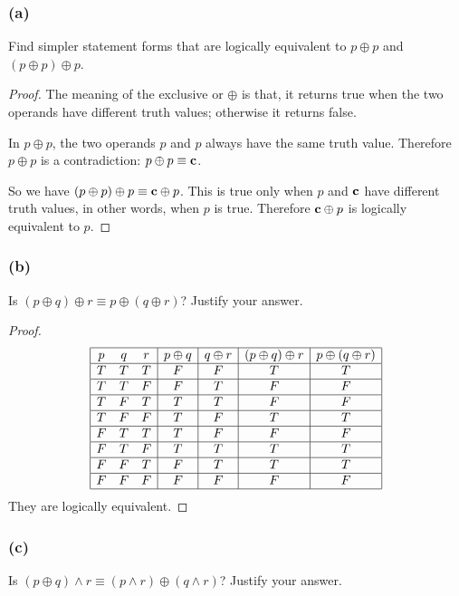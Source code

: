 \documentclass[14pt]{extarticle}
\newcommand{\false}{{\bf c}} \newcommand{\bic}{\leftrightarrow}
\begin{document}
\subsubsection{(a)} Find simpler statement forms that are logically equivalent
to $p \oplus p$ and $(p \oplus p) \oplus p$.

\begin{proof} The meaning of the exclusive or $\oplus$ is that, it returns true
when the two operands have different truth values; otherwise it returns false.

In $p \oplus p$, the two operands $p$ and $p$ always have the same truth value.
Therefore $p \oplus p$ is a contradiction: $p \oplus p \equiv \false$.

So we have $(p \oplus p) \oplus p \equiv \false \oplus p$. This is true only
when $p$ and $\false$ have different truth values, in other words, when $p$ is
true. Therefore $\false \oplus p$ is logically equivalent to $p$. \end{proof}

\subsubsection{(b)} Is $(p \oplus q) \oplus r \equiv p \oplus (q \oplus r)$?
Justify your answer.

\begin{proof} $$ \begin{array}{|ccc|c|c|c|c|} \hline p & q & r & p \oplus q & q
\oplus r & (p \oplus q) \oplus r & p \oplus (q \oplus r) \\ \hline T & T & T & F
& F & T & T \\ \hline T & T & F & F & T & F & F \\ \hline T & F & T & T & T & F
& F \\ \hline T & F & F & T & F & T & T \\ \hline F & T & T & T & F & F & F \\
\hline F & T & F & T & T & T & T \\ \hline F & F & T & F & T & T & T \\ \hline F
& F & F & F & F & F & F \\ \hline \end{array} $$ They are logically equivalent.
\end{proof}

\subsubsection{(c)} Is $(p \oplus q) \wedge r \equiv (p \wedge r) \oplus (q
\wedge r)$? Justify your answer.
\end{document}
